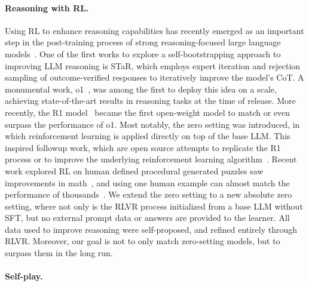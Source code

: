 \documentclass{article}
\begin{document}
\paragraph{Reasoning with RL.}
Using RL to enhance reasoning capabilities has recently emerged as an important step in the post-training process of strong reasoning-focused large language models~\citep{lambert2024t}. One of the first works to explore a self-bootstrapping approach to improving LLM reasoning is STaR, which employs expert iteration and rejection sampling of outcome-verified responses to iteratively improve the model's CoT. A monumental work, o1~\citep{jaech2024openai}, was among the first to deploy this idea on a scale, achieving state-of-the-art results in reasoning tasks at the time of release. More recently, the R1 model~\citep{guo2025deepseek} became the first open-weight model to match or even surpass the performance of o1. Most notably, the zero setting was introduced, in which reinforcement learning is applied directly on top of the base LLM. This inspired followup work, which are open source attempts to replicate the R1 process or to improve the underlying reinforcement learning algorithm~\citep{zeng2025simplerl,liu2025understanding,cui2025process,hu2025open,yu2025dapo,yuan2025vapo}. Recent work explored RL on human defined procedural generated puzzles saw improvements in math~\citep{xie2025logic}, and using one human example can almost match the performance of thousands~\citep{wang2025reinforcementlearningreasoninglarge}. We extend the zero setting to a new absolute zero setting, where not only is the RLVR process initialized from a base LLM without SFT, but no external prompt data or answers are provided to the learner. All data used to improve reasoning were self-proposed, and refined entirely through RLVR. Moreover, our goal is not to only match zero-setting models, but to surpass them in the long run.


\paragraph{Self-play.}
\end{document}
